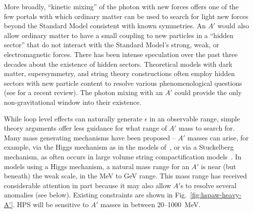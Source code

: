More broadly, ``kinetic mixing'' of the photon with new forces offers one of the few 
portals with which ordinary matter can be used to search for light new forces beyond the Standard Model
consistent with known symmetries. 
An $A'$ would also allow ordinary matter to have a small coupling to new particles in a ``hidden sector'' 
that do not interact with the Standard Model's strong, weak, or electromagnetic forces.  
There has been intense speculation over the past three decades about the existence 
of hidden sectors. Theoretical models with dark matter, supersymmetry, and string theory constructions often employ 
hidden sectors with new particle content to resolve various phenomenological questions~\cite{Goodsell:2010ie,NSF-ITP-84-170,PRINT-86-0084 (PRINCETON),Andreas:2011in,arXiv:1002.0329} 
(see \cite{Hewett:2012ns} for a recent review). 
The photon mixing with an $A'$ could provide the only non-gravitational window into their existence. 

While loop level effects can naturally generate $\epsilon$ in an observable range, 
simple theory arguments offer less guidance for what range of $A'$ mass to search for. 
Many mass generating mechanisms have been proposed -- $A'$ masses can arise, for example, 
via the Higgs mechanism as in the models of~\cite{Fayet:2007ua,Cheung:2009qd,ArkaniHamed:2008qp,Morrissey:2009ur},
or via a Stuckelberg mechanism, as often occurs in large volume string compactification models~\cite{Hewett:2012ns}.
In models using a Higgs mechanism, a natural mass range for an $A'$ is near (but beneath) the weak scale, 
in the MeV to GeV range. This mass range has received considerable attention in part because it may also 
allow $A'$s to resolve several anomalies (see below). Existing constraints 
are shown in Fig.~\ref{fig:hspaw-heavy-A'}. HPS will be sensitive to $A'$ masses in between 20--1000~MeV.

